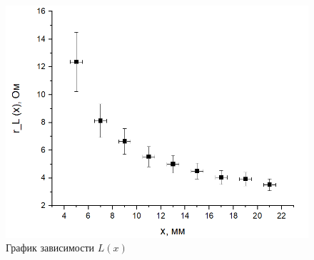 \documentclass[a4paper, fontsize = 14pt]{article}
\begin{document}
\begin{figure}
	\centering
	\includegraphics[scale=0.7]{lab48ris3.png}
	\caption{График зависимости $L(x)$}
\end{figure}
\end{document}
